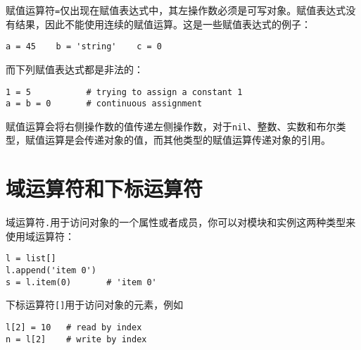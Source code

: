 赋值运算符\texttt{=}仅出现在赋值表达式中，其左操作数必须是可写对象。赋值表达式没有结果，因此不能使用连续的赋值运算。这是一些赋值表达式的例子：
\begin{lstlisting}[language=berry, numbers=none]
a = 45    b = 'string'    c = 0
\end{lstlisting}
而下列赋值表达式都是非法的：
\begin{lstlisting}[language=berry, numbers=none]
1 = 5           # trying to assign a constant 1
a = b = 0       # continuous assignment
\end{lstlisting}

赋值运算会将右侧操作数的值传递左侧操作数，对于\texttt{nil}、整数、实数和布尔类型，赋值运算是会传递对象的值，而其他类型的赋值运算传递对象的引用。

\section{域运算符和下标运算符}

域运算符\texttt{.}用于访问对象的一个属性或者成员，你可以对模块和实例这两种类型来使用域运算符：
\begin{lstlisting}[language=berry, numbers=none]
l = list[]
l.append('item 0')
s = l.item(0)       # 'item 0'
\end{lstlisting}

下标运算符\texttt{[]}用于访问对象的元素，例如
\begin{lstlisting}[language=berry, numbers=none]
l[2] = 10   # read by index
n = l[2]    # write by index
\end{lstlisting}
